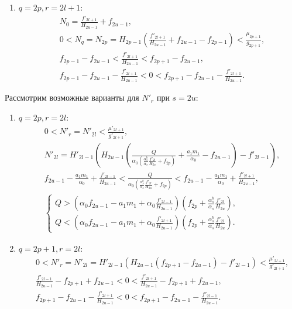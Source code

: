 \begin{enumerate}[leftmargin=10pt,itemindent=26pt]
    \item \(q=2p, r=2l+1\):
    \begin{align*}
        & N_0 = \frac{f'_{2l+1}}{H_{2u-1}} + f_{2u-1}, \\
        & 0 < N_q = N_{2p} = H_{2p-1} \left( \frac{f'_{2l+1}}{H_{2u-1}} + f_{2u-1} - f_{2p-1} \right) < \frac{\mu_{2p+1}}{g_{2p+1}}, \\
        & f_{2p-1} - f_{2u-1} < \frac{f'_{2l+1}}{H_{2u-1}} < f_{2p+1} - f_{2u-1}, \\
        & f_{2p-1} - f_{2u-1} - \frac{f'_{2l+1}}{H_{2u-1}} < 0 < f_{2p+1} - f_{2u-1} - \frac{f'_{2l+1}}{H_{2u-1}}.
    \end{align*}
\end{enumerate}

Рассмотрим возможные варианты для \(N'_r\) при \(s=2u\):
\begin{enumerate}[leftmargin=10pt,itemindent=26pt]
    \item \(q=2p, r=2l\):
    \begin{align*}
        & 0 < N'_r = N'_{2l} < \frac{\mu'_{2l+1}}{g'_{2l+1}}, \\
        & N'_{2l} = H'_{2l-1} \left( H_{2u-1} \left( \frac{Q}{\alpha_0 \left( \frac{\alpha^b_s}{\alpha_s} \frac{f'_{2l}}{H_{2u}} + f_{2p} \right)} + \frac{a_1 m_1}{\alpha_0} - f_{2u-1} \right) - f'_{2l-1} \right), \\
        & f_{2u-1} - \frac{a_1 m_1}{\alpha_0} + \frac{f'_{2l-1}}{H_{2u-1}} < \frac{Q}{\alpha_0 \left( \frac{\alpha^b_s}{\alpha_s} \frac{f'_{2l}}{H_{2u}} + f_{2p} \right)} < f_{2u-1} - \frac{a_1 m_1}{\alpha_0} + \frac{f'_{2l+1}}{H_{2u-1}}, \\
        & \begin{cases}
            Q > \left( \alpha_0 f_{2u-1} - a_1 m_1 + \alpha_0 \frac{f'_{2l-1}}{H_{2u-1}} \right) \left( f_{2p} + \frac{\alpha^b_s}{\alpha_s} \frac{f'_{2l}}{H_{2u}} \right), \\
            Q < \left( \alpha_0 f_{2u-1} - a_1 m_1 + \alpha_0 \frac{f'_{2l+1}}{H_{2u-1}} \right) \left( f_{2p} + \frac{\alpha^b_s}{\alpha_s} \frac{f'_{2l}}{H_{2u}} \right).
        \end{cases}
    \end{align*}

    \item \(q=2p+1, r=2l\):
    \begin{align*}
        & 0 < N'_{r} = N'_{2l} = H'_{2l-1} \left( H_{2u-1} \left( f_{2p+1} - f_{2u-1} \right) - f'_{2l-1} \right) < \frac{\mu'_{2l+1}}{g'_{2l+1}}, \\
        & \frac{f'_{2l-1}}{H_{2u-1}} - f_{2p+1} + f_{2u-1} < 0 < \frac{f'_{2l+1}}{H_{2u-1}} - f_{2p+1} + f_{2u-1}, \\
        & f_{2p+1} - f_{2u-1} - \frac{f'_{2l+1}}{H_{2u-1}} < 0 < f_{2p+1} - f_{2u-1} - \frac{f'_{2l-1}}{H_{2u-1}}.
    \end{align*}


\end{enumerate}
